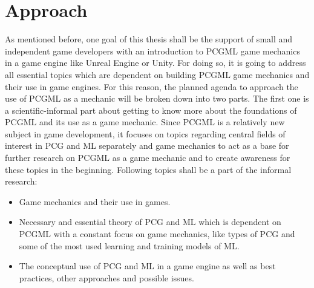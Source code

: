 \documentclass[MGS,Master,english]{twbook}%
\begin{document}
\section{Approach}
As mentioned before, one goal of this thesis shall be the support of small and independent game developers with an introduction to PCGML game mechanics in a game engine like Unreal Engine or Unity. For doing so, it is going to address all essential topics which are dependent on building PCGML game mechanics and their use in game engines. For this reason, the planned agenda to approach the use of PCGML as a mechanic will be broken down into two parts. The first one is a scientific-informal part about getting to know more about the foundations of \ac{PCGML} and its use as a game mechanic. Since \ac{PCGML} is a relatively new subject in game development, it focuses on topics regarding central fields of interest in \ac{PCG} and \ac{ML} separately and game mechanics to act as a base for further research on \ac{PCGML} as a game mechanic and to create awareness for these topics in the beginning. Following topics shall be a part of the informal research:
\begin{itemize}
	\item Game mechanics and their use in games.
	\item Necessary and essential theory of PCG and ML which is dependent on PCGML with a constant focus on game mechanics, like types of PCG and some of the most used learning and training models of ML.
	\item The conceptual use of PCG and ML in a game engine as well as best practices, other approaches and possible issues.
\end{itemize}
\end{document}
